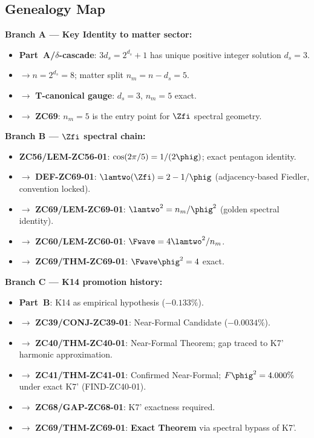 \documentclass[12pt, a4paper]{article}
\begin{document}
\subsection{Genealogy Map}
\label{sec:genealogy}

\begin{genealogybox}[title={How ZC69's Key Objects Trace Back}]

\textbf{Branch A --- Key Identity to matter sector:}
\begin{itemize}[leftmargin=2em, noitemsep]
  \item \textbf{Part~A/$\delta$-cascade}:
    $3d_s = 2^{d_s}+1$ has unique positive integer solution $d_s = 3$.
  \item $\to n = 2^{d_s} = 8$; matter split $n_m = n - d_s = 5$.
  \item $\to$ \textbf{T-canonical gauge}: $d_s=3$, $n_m=5$ exact.
  \item $\to$ \textbf{ZC69}: $n_m = 5$ is the entry point for $\Zfi$
    spectral geometry.
\end{itemize}

\textbf{Branch B --- $\Zfi$ spectral chain:}
\begin{itemize}[leftmargin=2em, noitemsep]
  \item \textbf{ZC56/LEM-ZC56-01}:
    $\cos(2\pi/5) = 1/(2\phig)$; exact pentagon identity.
  \item $\to$ \textbf{DEF-ZC69-01}: $\lamtwo(\Zfi) = 2-1/\phig$
    (adjacency-based Fiedler, convention locked).
  \item $\to$ \textbf{ZC69/LEM-ZC69-01}:
    $\lamtwo^2 = n_m/\phig^2$ (golden spectral identity).
  \item $\to$ \textbf{ZC60/LEM-ZC60-01}: $\Fwave = 4\lamtwo^2/n_m$.
  \item $\to$ \textbf{ZC69/THM-ZC69-01}: $\Fwave\phig^2 = 4$ exact.
\end{itemize}

\textbf{Branch C --- K14 promotion history:}
\begin{itemize}[leftmargin=2em, noitemsep]
  \item \textbf{Part~B}: K14 as empirical hypothesis ($-0.133\%$).
  \item $\to$ \textbf{ZC39/CONJ-ZC39-01}: Near-Formal Candidate ($-0.0034\%$).
  \item $\to$ \textbf{ZC40/THM-ZC40-01}: Near-Formal Theorem;
    gap traced to K7' harmonic approximation.
  \item $\to$ \textbf{ZC41/THM-ZC41-01}: Confirmed Near-Formal;
    $F\phig^2=4.000\%$ under exact K7' (FIND-ZC40-01).
  \item $\to$ \textbf{ZC68/GAP-ZC68-01}: K7' exactness required.
  \item $\to$ \textbf{ZC69/THM-ZC69-01}: \textbf{Exact Theorem}
    via spectral bypass of K7'.
\end{itemize}


\end{genealogybox}
\end{document}
